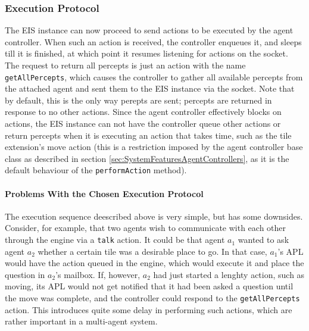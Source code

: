 \subsubsection*{Execution Protocol}

The EIS instance can now proceed to send actions to be executed by
the agent controller. When such an action is received, the controller
enqueues it, and sleeps till it is finished, at which point it resumes
listening for actions on the socket. The request to return all percepts
is just an action with the name \texttt{getAllPercepts}, which causes
the controller to gather all available percepts from the attached
agent and sent them to the EIS instance via the socket. Note that
by default, this is the only way perepts are sent; percepts are returned
in response to no other actions. Since the agent controller effectively
blocks on actions, the EIS instance can not have the controller queue
other actions or return percepts when it is executing an action that
takes time, such as the tile extension's move action (this is a restriction
imposed by the agent controller base class as described in section
\ref{sec:SystemFeaturesAgentControllers}, as it is the default behaviour
of the \texttt{performAction} method).


\paragraph*{Problems With the Chosen Execution Protocol}

The execution sequence deescribed above is very simple, but has some
downsides. Consider, for example, that two agents wish to communicate
with each other through the engine via a \texttt{talk} action. It
could be that agent $a_{1}$ wanted to ask agent $a_{2}$ whether
a certain tile was a desirable place to go. In that case, $a_{1}$'s
APL would have the action queued in the engine, which would execute
it and place the question in $a_{2}$'s mailbox. If, however, $a_{2}$
had just started a lenghty action, such as moving, its APL would not
get notified that it had been asked a question until the move was
complete, and the controller could respond to the \texttt{getAllPercepts}
action. This introduces quite some delay in performing such actions,
which are rather important in a multi-agent system. 

